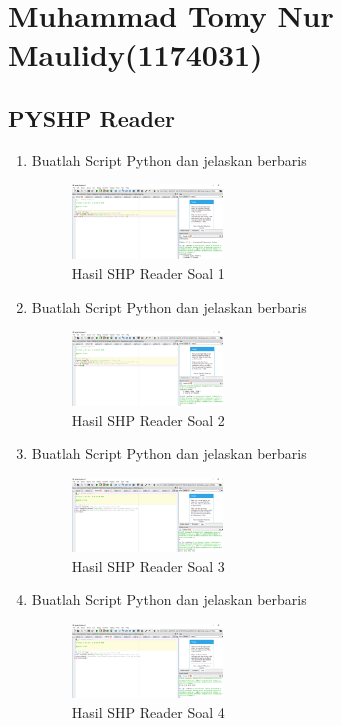 \section{Muhammad Tomy Nur Maulidy(1174031)}
\subsection{PYSHP Reader}
\begin{enumerate}
    \item Buatlah Script Python dan jelaskan berbaris
    
    \hfill\break
    \begin{figure}[H]
		\includegraphics[width=4cm]{figures/1174031/3/soal1.PNG}
		\centering
		\caption{Hasil SHP Reader Soal 1}
    \end{figure}
    
    \item Buatlah Script Python dan jelaskan berbaris
    
    \hfill\break
    \begin{figure}[H]
		\includegraphics[width=4cm]{figures/1174031/3/soal2.PNG}
		\centering
		\caption{Hasil SHP Reader Soal 2}
    \end{figure}
    
    \item Buatlah Script Python dan jelaskan berbaris
    
    \hfill\break
    \begin{figure}[H]
		\includegraphics[width=4cm]{figures/1174031/3/soal3.PNG}
		\centering
		\caption{Hasil SHP Reader Soal 3}
    \end{figure}
    
    \item Buatlah Script Python dan jelaskan berbaris
    
    \hfill\break
    \begin{figure}[H]
		\includegraphics[width=4cm]{figures/1174031/3/soal4.PNG}
		\centering
		\caption{Hasil SHP Reader Soal 4}
    \end{figure}
    

\end{enumerate}
